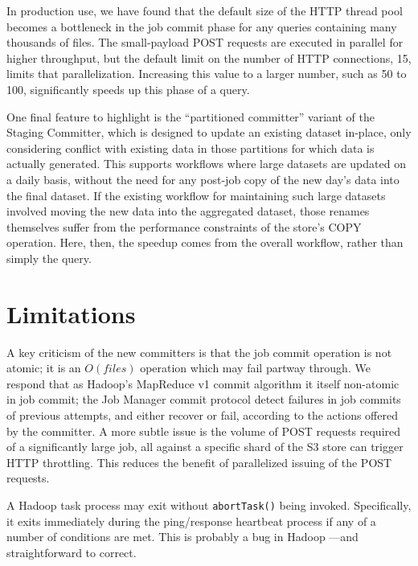 \documentclass[conference]{IEEEtran}
\begin{document}
In production use, we have found that the default size of the HTTP thread
pool becomes a bottleneck in the job commit phase for any queries
containing many thousands of files.
The small-payload POST requests are executed in parallel for higher
throughput, but the default limit on the number of HTTP connections, 15, 
limits that parallelization.
Increasing this value to a larger number, such as 50 to 100, significantly
speeds up this phase of a query. 

One final feature to highlight is the ``partitioned committer'' variant
of the Staging Committer, which is designed to update an existing
dataset in-place, only considering conflict with existing data in
those partitions for which data is actually generated.
This supports workflows where large datasets are updated on a daily basis,
without the need for any post-job copy of the new day's data into the
final dataset.
If the existing workflow for maintaining such large datasets involved
moving the new data into the aggregated dataset, those renames themselves
suffer from the performance constraints of the store's COPY operation.
Here, then, the speedup comes from the overall workflow, rather than
simply the query.



\section{Limitations}
\label{sec:limitations}

A key criticism of the new committers is that the job commit operation is not atomic;
it is an $O(files)$ operation which may fail partway through.
We respond that as Hadoop's MapReduce v1 commit algorithm it itself non-atomic in job commit;
the Job Manager commit protocol detect failures in job commits
of previous attempts, and either recover or fail, according to the actions
offered by the committer.
A more subtle issue is the volume of POST requests required of a significantly large job,
all against a specific shard of the S3 store can trigger HTTP throttling.
This reduces the benefit of parallelized issuing of the POST requests.

A Hadoop task process may exit without \texttt{abortTask()} being invoked.
Specifically, it exits immediately during the ping/response
heartbeat process if any of a number of conditions are met.
This is probably a bug in Hadoop ---and straightforward to correct.
\end{document}
